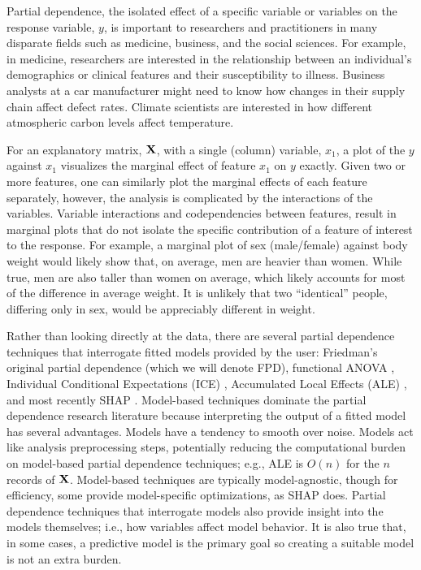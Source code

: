 \documentclass[]{article} %
\begin{document}
Partial dependence, the isolated effect of a specific variable or variables on the response variable, $y$, is important to researchers and practitioners in many disparate fields such as medicine, business, and the social sciences. For example, in medicine, researchers are interested in the relationship between an individual's demographics or clinical features and their susceptibility to illness. Business analysts at a car manufacturer might need to know how changes in their supply chain affect defect rates. Climate scientists are interested in how different atmospheric carbon levels affect temperature.

For an explanatory matrix, $\bf X$, with a single (column) variable, $x_1$, a plot of the $y$ against $x_1$ visualizes the marginal effect of feature $x_1$ on $y$ exactly. Given two or more features, one can similarly plot the marginal effects of each feature separately, however, the analysis is complicated by the interactions of the variables.   Variable interactions and codependencies between features, result in marginal plots that do not isolate the specific contribution of a feature of interest to the response. For example, a marginal plot of sex (male/female) against body weight would likely show that, on average, men are heavier than women. While true, men are also taller than women on average, which likely accounts for most of the difference in average weight. It is unlikely that two ``identical'' people, differing only in sex, would be appreciably different in weight.  

Rather than looking directly at the data, there are several partial dependence techniques that interrogate fitted models provided by the user: Friedman's original partial dependence \citep{PDP} (which we will denote FPD), functional ANOVA \citep{fanova}, Individual Conditional Expectations (ICE) \citep{ICE}, Accumulated Local Effects (ALE) \citep{ALE}, and most recently SHAP \citep{shap}.  Model-based techniques dominate the partial dependence research literature because interpreting the output of a fitted model  has several advantages. Models have a tendency to smooth over noise. Models act like analysis preprocessing steps, potentially reducing the computational burden on model-based partial dependence techniques; e.g., ALE is $O(n)$ for the $n$ records of $\bf X$. Model-based techniques are typically model-agnostic, though for efficiency, some provide model-specific optimizations, as SHAP does. Partial dependence techniques that interrogate models also provide insight into the models themselves; i.e., how variables affect model behavior.  It is also true that, in some cases, a predictive model is the primary goal so creating a suitable model is not an extra burden.
\end{document}

